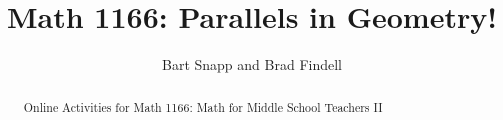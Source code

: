 \documentclass[handout,space]{xourse}
\title{Math 1166: Parallels in Geometry!}
\author{Bart Snapp and Brad Findell}
\begin{document}
\begin{abstract}
Online Activities for Math 1166: Math for Middle School Teachers II
\end{abstract}
\maketitle

{}
\end{document}
